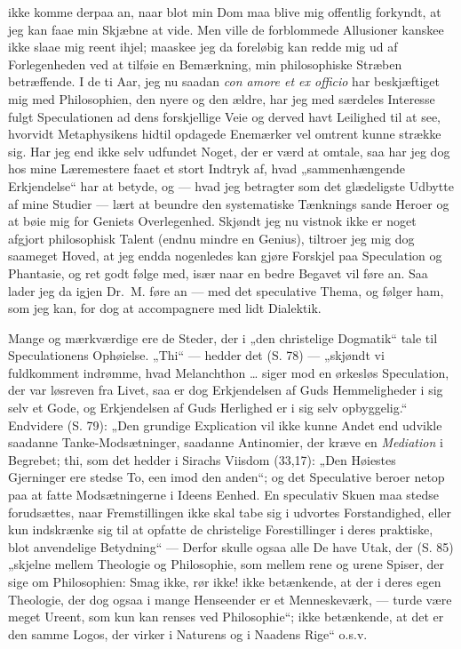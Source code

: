 ikke komme derpaa an, naar blot min Dom maa blive mig offentlig
forkyndt, at jeg kan faae min Skjæbne at vide. Men ville de
forblommede Allusioner kanskee ikke slaae mig reent ihjel; maaskee
jeg da foreløbig kan redde mig ud af Forlegenheden ved at tilføie
en Bemærkning, min philosophiske Stræben betræffende. I de ti Aar,
jeg nu saadan \textit{con amore et ex officio} har beskjæftiget
mig med Philosophien, den nyere og den ældre, har jeg med særdeles
Interesse fulgt Speculationen ad dens forskjellige Veie og derved
havt Leilighed til at see, hvorvidt Metaphysikens hidtil opdagede
Enemærker vel omtrent kunne strække sig. Har jeg end ikke selv
udfundet Noget, der er værd at omtale, saa har jeg dog hos mine
Læremestere faaet et stort Indtryk af, hvad „sammenhængende
Erkjendelse“ har at betyde, og --- hvad jeg betragter som det
glædeligste Udbytte af mine Studier --- lært at beundre den
systematiske Tænknings sande Heroer og at bøie mig for Geniets
Overlegenhed. Skjøndt jeg nu vistnok ikke er noget afgjort
philosophisk Talent
 (endnu mindre en Genius), tiltroer jeg mig dog saameget Hoved, at
jeg endda nogenledes kan gjøre Forskjel paa Speculation og
Phantasie, og ret godt følge med, især naar en bedre Begavet vil
føre an. Saa lader jeg da igjen Dr.\ M. føre an --- med det
speculative Thema, og følger ham, som jeg kan, for dog at
accompagnere med lidt Dialektik.

Mange og mærkværdige ere de Steder, der i „den christelige
Dogmatik“ tale til Speculationens Ophøielse. „Thi“ --- hedder det
(S. 78) --- „skjøndt vi fuldkomment indrømme, hvad Melanchthon
\ldots{} siger mod en ørkesløs Speculation, der var løsreven fra
Livet, saa er dog Erkjendelsen af Guds Hemmeligheder i sig selv et
Gode, og Erkjendelsen af Guds Herlighed er i sig selv
opbyggelig.“ Endvidere (S. 79): „Den grundige Explication vil ikke
kunne Andet end udvikle saadanne Tanke-Modsætninger, saadanne
Antinomier, der kræve en \emph{Mediation} i Begrebet; thi, som det
hedder i Sirachs Viisdom (33,17): „Den Høiestes Gjerninger ere
stedse To, een imod den anden“; og det Speculative beroer netop
paa at fatte Modsætningerne i Ideens Eenhed. En speculativ Skuen
maa stedse forudsættes, naar Fremstillingen ikke skal tabe sig i
udvortes Forstandighed, eller kun indskrænke sig til at opfatte de
christelige Forestillinger i deres praktiske, blot anvendelige
Betydning“ --- Derfor skulle ogsaa alle De have Utak, der (S. 85)
„skjelne mellem Theologie og Philosophie, som mellem rene og urene
Spiser, der sige om Philosophien: Smag
 ikke, rør ikke! ikke betænkende, at der i deres egen Theologie,
der dog ogsaa i mange Henseender er et Menneskeværk, --- turde
være meget Ureent, som kun kan renses ved Philosophie“; ikke
betænkende, at det er den samme Logos, der virker i Naturens og i
Naadens Rige“ o.s.v.

